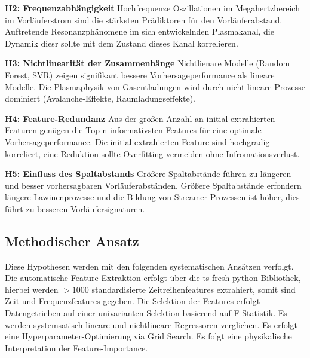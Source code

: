 \textbf{H2: Frequenzabhängigkeit}\newline
Hochfrequenze Oszillationen im Megahertzbereich im Vorläuferstrom sind die stärksten Prädiktoren für den Vorläuferabstand.\newline
Auftretende Resonanzphänomene im sich entwickelnden Plasmakanal, die Dynamik diesr sollte mit dem Zustand dieses Kanal korrelieren.\newline

\textbf{H3: Nichtlinearität der Zusammenhänge}\newline
Nichtlienare Modelle (Random Forest, SVR) zeigen signifikant bessere Vorhersageperformance als lineare Modelle.\newline
Die Plasmaphysik von Gasentladungen wird durch nicht lineare Prozesse dominiert (Avalanche-Effekte, Raumladungseffekte).\newline

\textbf{H4: Feature-Redundanz}\newline
Aus der großen Anzahl an initial extrahierten Featuren genügen die Top-n informativsten Features für eine optimale Vorhersageperformance.\newline
Die initial extrahierten Feature sind hochgradig korreliert, eine Reduktion sollte Overfitting vermeiden ohne Infromationsverlust.

\textbf{H5: Einfluss des Spaltabstands}\newline
Größere Spaltabstände führen zu längeren und besser vorhersagbaren Vorläuferabständen.\newline
Größere Spaltabstände erfondern längere Lawinenprozesse und die Bildung von Streamer-Prozessen ist höher, dies führt zu besseren Vorläufersignaturen.

\subsection{Methodischer Ansatz}
Diese Hypothesen werden mit den folgenden systematischen Ansätzen verfolgt. Die automatische Feature-Extraktion erfolgt über die ts-fresh python Bibliothek, hierbei werden \(> 1000\) standardisierte Zeitreihenfeatures extrahiert, somit sind Zeit und Frequenzfeatures gegeben. Die Selektion der Features erfolgt Datengetrieben auf einer univarianten Selektion basierend auf F-Statistik. Es werden systemsatisch lineare und nichtlineare Regressoren verglichen. Es erfolgt eine Hyperparameter-Optimierung via Grid Search. Es folgt eine physikalische Interpretation der Feature-Importance.

